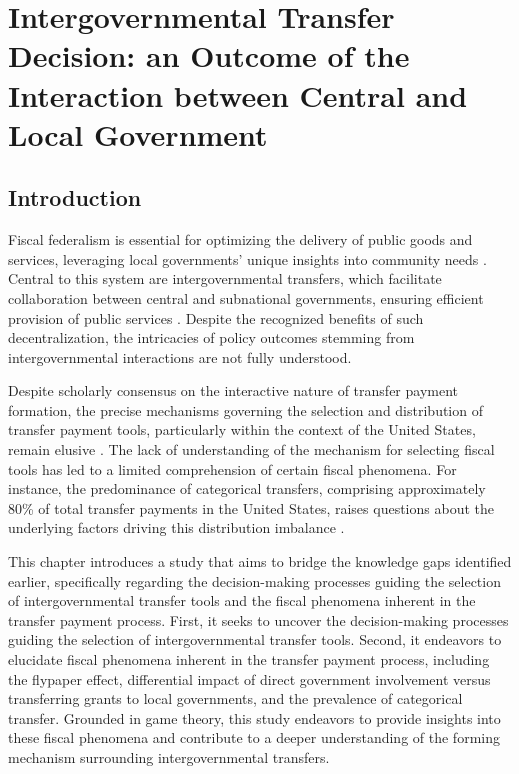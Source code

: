 
\chapter{Intergovernmental Transfer Decision: an Outcome of the Interaction between Central and Local Government}


\section{Introduction}

Fiscal federalism is essential for optimizing the delivery of public goods and services, leveraging local governments' unique insights into community needs  \parencite{hayek2009use,stigler1998tenable}. Central to this system are intergovernmental transfers, which facilitate collaboration between central and subnational governments, ensuring efficient provision of public services  \parencite{press1963american, grodzins1966american}. Despite the recognized benefits of such decentralization, the intricacies of policy outcomes stemming from intergovernmental interactions are not fully understood.

Despite scholarly consensus on the interactive nature of transfer payment formation, the precise mechanisms governing the selection and distribution of transfer payment tools, particularly within the context of the United States, remain elusive \parencite{1988Exploring,1967American, 2010Centralization,chubb1985political,1976A,dixit1995redistributive}. The lack of understanding of the mechanism for selecting fiscal tools has led to a limited comprehension of certain fiscal phenomena. For instance, the predominance of categorical transfers, comprising approximately 80\% of total transfer payments in the United States, raises questions about the underlying factors driving this distribution imbalance \parencite{dilger2015federal}.


This chapter introduces a study that aims to bridge the knowledge gaps identified earlier, specifically regarding the decision-making processes guiding the selection of intergovernmental transfer tools and the fiscal phenomena inherent in the transfer payment process. First, it seeks to uncover the decision-making processes guiding the selection of intergovernmental transfer tools. Second, it endeavors to elucidate fiscal phenomena inherent in the transfer payment process, including the flypaper effect, differential impact of direct government involvement versus transferring grants to local governments, and the prevalence of categorical transfer. Grounded in game theory, this study endeavors to provide insights into these fiscal phenomena and contribute to a deeper understanding of the forming mechanism surrounding intergovernmental transfers.


